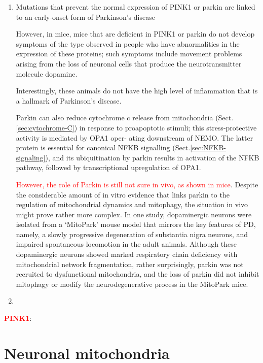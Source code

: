 \begin{enumerate}
  \item  Mutations that prevent the normal expression of PINK1 or parkin are linked to an early-onset form of Parkinson’s disease
  
  However, in mice, mice that are deficient in PINK1 or parkin do not develop
  symptoms of the type observed in people who have abnormalities in the
  expression of these proteins; such symptoms include movement problems arising
  from the loss of neuronal cells that produce the neurotransmitter molecule
  dopamine.
  
  Interestingly, these animals do not have the high level of inflammation that
  is a hallmark of Parkinson’s disease.
  
  Parkin can also reduce cytochrome c release from mitochondria
(Sect.\ref{sec:cytochrome-C}) in response to proapoptotic stimuli; this
stress-protective activity is mediated by OPA1 oper- ating downstream of NEMO.
The latter protein is essential for canonical NFKB signalling
(Sect.\ref{sec:NFKB-signaling}), and its ubiquitination by parkin results in
activation of the NFKB pathway, followed by transcriptional upregulation of
OPA1.

\textcolor{red}{However, the role of Parkin is still not sure in vivo, as shown in mice}.
Despite the considerable amount of in vitro evidence that links parkin to the
regulation of mitochondrial dynamics and mitophagy, the situation in vivo might
prove rather more complex. In one study, dopaminergic neurons were isolated from
a ‘MitoPark’ mouse model that mirrors the key features of PD, namely, a slowly
progressive degeneration of substantia nigra neurons, and impaired spontaneous
locomotion in the adult animals.
Although these dopaminergic neurons showed marked respiratory chain deficiency
with mitochondrial network fragmentation, rather surprisingly, parkin was not
recruited to dysfunctional mitochondria, and the loss of parkin did not inhibit
mitophagy or modify the neurodegenerative process in the MitoPark mice.


  
  \item 
\end{enumerate}






\label{sec:PINK1}
\textcolor{red}{\bf PINK1}:

\section{Neuronal mitochondria}
\label{sec:mitochondria-brain}

